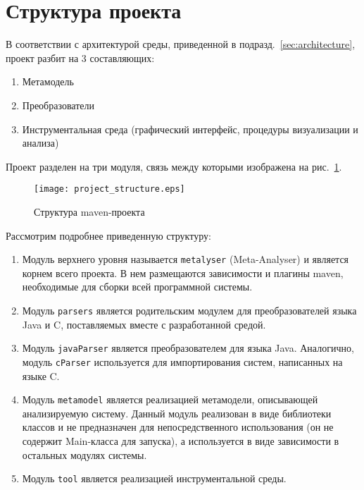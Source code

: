\section{Структура проекта}

В соответствии с архитектурой среды, приведенной в
подразд.~\ref{sec:architecture}, проект разбит на 3 составляющих:

\begin{enumerate}
    \item Метамодель
    \item Преобразователи
    \item Инструментальная среда (графический интерфейс, процедуры визуализации
    и анализа)
\end{enumerate}


Проект разделен на три модуля, связь между которыми изображена на
рис.~\ref{fig:project_structure}.

\begin{figure}[ht]
    \begin{center}
        \texttt{[image: project\_structure.eps]}
    \end{center}
    \caption{Структура maven-проекта}
    \label{fig:project_structure}
\end{figure}

Рассмотрим подробнее приведенную структуру:

\begin{enumerate}
    \item Модуль верхнего уровня называется \texttt{metalyser} (Meta-Analyser) и
    является корнем всего проекта. В нем размещаются зависимости и плагины maven,
    необходимые для сборки всей программной системы.
    \item Модуль \texttt{parsers} является родительским модулем для
    преобразователей языка Java и C, поставляемых вместе с разработанной средой.
    \item Модуль \texttt{javaParser} является преобразователем для языка Java.
    Аналогично, модуль \texttt{cParser} используется для импортирования систем,
    написанных на языке C.
    \item Модуль \texttt{metamodel} является реализацией метамодели,
    описывающей анализируемую систему. Данный модуль реализован в виде
    библиотеки классов и не предназначен для непосредственного использования
    (он не содержит Main-класса для запуска), а используется в виде зависимости
    в остальных модулях системы.
    \item Модуль \texttt{tool} является реализацией инструментальной среды.
\end{enumerate}

